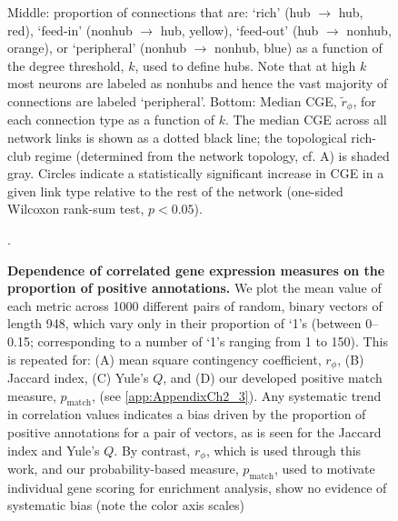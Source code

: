 \begin{figure}[h!]
{Middle: proportion of connections that are: `rich' (hub $\rightarrow$ hub, red), `feed-in' (nonhub $\rightarrow$ hub, yellow), `feed-out' (hub $\rightarrow$ nonhub, orange), or `peripheral' (nonhub $\rightarrow$ nonhub, blue) as a function of the degree threshold, $k$, used to define hubs.
Note that at high $k$ most neurons are labeled as nonhubs and hence the vast majority of connections are labeled `peripheral'.
Bottom: Median CGE, $\tilde{r}_\phi$, for each connection type as a function of $k$.
The median CGE across all network links is shown as a dotted black line; the topological rich-club regime (determined from the network topology, cf. A) is shaded gray.
Circles indicate a statistically significant increase in CGE in a given link type relative to the rest of the network (one-sided Wilcoxon rank-sum test, $p < 0.05$).}

\label{fig:Ch2S1_Fig}
\end{figure}

\begin{figure}[h!]
 \caption{{\bf Dependence of correlated gene expression measures on the proportion of positive annotations.} We plot the mean value of each metric across 1000 different pairs of random, binary vectors of length 948, which vary only in their proportion of `1's (between 0--0.15; corresponding to a number of `1's ranging from 1 to 150).
This is repeated for:
(A) mean square contingency coefficient, $r_\phi$,
(B) Jaccard index,
(C) Yule's $Q$, and
(D) our developed positive match measure, $p_\mathrm{match}$, (see \ref{app:AppendixCh2_3}).
Any systematic trend in correlation values indicates a bias driven by the proportion of positive annotations for a pair of vectors, as is seen for the Jaccard index and Yule's $Q$.
By contrast, $r_\phi$, which is used through this work, and our probability-based measure, $p_\mathrm{match}$, used to motivate individual gene scoring for enrichment analysis, show no evidence of systematic bias (note the color axis scales)}.
\label{fig:Ch2S2_Fig}
\end{figure}


